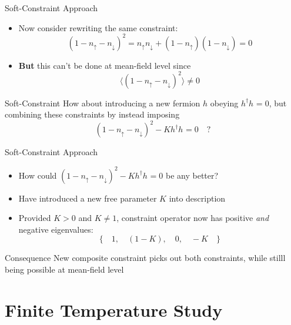 \documentclass[13pt]{beamer}
\begin{document}

  \begin{frame}{Soft-Constraint Approach}

  \begin{itemize}
    \item Now consider rewriting the same constraint: $$ (1 - n_{\uparrow} - n_{\downarrow})^2 = n_{\uparrow} n_{\downarrow} + (1 - n_{\uparrow})(1 - n_{\downarrow}) = 0 $$
    \item \textbf{But} this can't be done at mean-field level since $$ \langle (1 - n_{\uparrow} - n_{\downarrow})^2 \rangle \neq 0 $$

    \end{itemize}

    \begin{block}{Soft-Constraint}
      How about introducing a new fermion $ h $ obeying $ h^{\dagger} h^{} = 0 $, but combining these constraints by instead imposing $$ (1 - n_{\uparrow} - n_{\downarrow})^2 - K h^{\dagger} h^{} = 0 \quad ? $$
    \end{block}

  \end{frame}

  \begin{frame}{Soft-Constraint Approach}

  \begin{itemize}
    \item How could $ (1 - n_{\uparrow} - n_{\downarrow})^2 - K h^{\dagger} h^{} = 0 $ be any better?
    \item Have introduced a new free parameter $ K $ into description
    \item Provided $ K > 0 $ and $ K \neq 1 $, constraint operator now has positive \textit{and} negative eigenvalues: $$ \{ \quad 1, \quad (1 - K), \quad 0, \quad -K \quad \} $$
  \end{itemize}

  \begin{block}{Consequence}
  New composite constraint picks out both constraints, while stilll being possible at mean-field level
  \end{block}
  \end{frame}

  \section{Finite Temperature Study}
\end{document}
